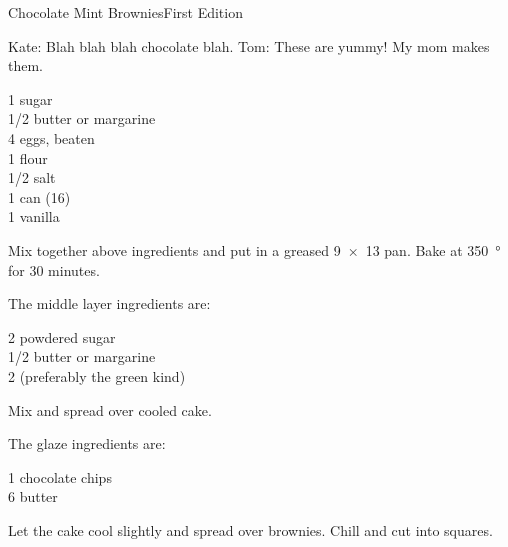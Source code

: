 \begin{entry}{Chocolate Mint Brownies}{First Edition}

\begin{open}
  Kate: Blah blah blah chocolate blah. Tom: These are yummy!  My mom makes
  them.
\end{open}
\begin{ingredients}
  \SI{1}{\cup} sugar\\
  \SI{1/2}{\cup} butter or margarine\\
  4 eggs, beaten\\
  \SI{1}{\cup} flour\\
  \SI{1/2}{\teaspoon} salt\\
  1 can  (\SI{16}{\ounce})\\
  \SI{1}{\teaspoon} vanilla
\end{ingredients}
Mix together above ingredients and put in a greased \SI{9x13}{\inch} pan.
Bake at \SI{350}{\degree} for 30 minutes.

The middle layer ingredients are:
\begin{ingredients}
  \SI{2}{\cup} powdered sugar\\
  \SI{1/2}{\cup} butter or margarine\\
  \SI{2}{\tblspoon}  (preferably the green kind)
\end{ingredients}
Mix and spread over cooled cake.

The glaze ingredients are:
\begin{ingredients}
  \SI{1}{\cup} chocolate chips\\
  \SI{6}{\tblspoon} butter
\end{ingredients}
Let the cake cool slightly and spread over brownies.  Chill and cut into
squares.
\end{entry}

